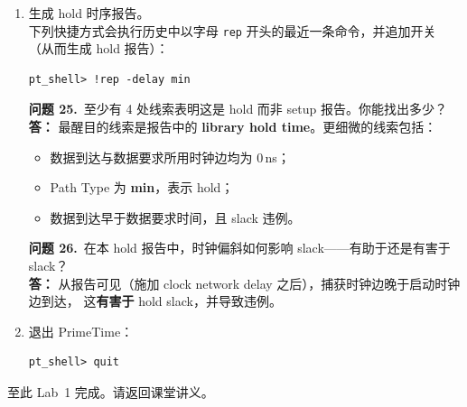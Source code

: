 \begin{enumerate}
\begin{questionBox}
\textbf{问题 21.}\ 写出起点与终点触发器的实例名。\\[0.35em]
\textbf{答：}\\
\begin{lstlisting}
Startpoint: I_ORCA_TOP/I_BLENDER/s3_op2_reg[18]
  (rising edge-triggered flip-flop clocked by SYS_CLK)
Endpoint:   I_ORCA_TOP/I_BLENDER/s4_op2_reg[31]
  (rising edge-triggered flip-flop clocked by SYS_CLK)
Path Group: SYS_CLK
Path Type:  max
\end{lstlisting}

\textbf{问题 22.}\ 该时序路径的时钟偏斜（clock skew）为 0.511\,ns；可用报告中的哪两行计算得到？\\[0.35em]
\textbf{答：} 可用启动端与捕获端的 \texttt{clock network delay (propagated)} 两行：
$3.247 - 2.736 = 0.511$\,ns。
\end{questionBox}

\begin{questionBox}
\textbf{问题 23.}\ 该时钟偏斜如何影响松弛（slack）——有助于还是有害于 slack？\\[0.35em]
\textbf{答：} 在本条 setup 报告中，时钟偏斜\textbf{有害于} slack：
启动端触发器的时钟延迟使数据晚到约 0.511\,ns，从而加大 setup 违例。

\textbf{问题 24.}\ 违例相对于时钟周期有多大？\\[0.35em]
\textbf{答：} 时钟周期为 8\,ns，违例约 0.987\,ns，大约相当于周期的 \textbf{12\%}。
\end{questionBox}

  \item 生成 hold 时序报告。\\
        下列快捷方式会执行历史中以字母 \texttt{rep} 开头的最近一条命令，并追加开关 （从而生成 hold 报告）：
\begin{lstlisting}
pt_shell> !rep -delay min
\end{lstlisting}

\begin{questionBox}
\textbf{问题 25.}\ 至少有 4 处线索表明这是 hold 而非 setup 报告。你能找出多少？\\[0.35em]
\textbf{答：} 最醒目的线索是报告中的 \textbf{library hold time}。更细微的线索包括：
\begin{itemize}
  \item 数据到达与数据要求所用时钟边均为 0\,ns；
  \item Path Type 为 \textbf{min}，表示 hold；
  \item 数据到达早于数据要求时间，且 slack 违例。
\end{itemize}

\textbf{问题 26.}\ 在本 hold 报告中，时钟偏斜如何影响 slack——有助于还是有害于 slack？\\[0.35em]
\textbf{答：} 从报告可见（施加 clock network delay 之后），捕获时钟边晚于启动时钟边到达，
这\textbf{有害于} hold slack，并导致违例。
\end{questionBox}

  \item 退出 PrimeTime：
\begin{lstlisting}
pt_shell> quit
\end{lstlisting}
\end{enumerate}

\noindent 至此 Lab~1 完成。请返回课堂讲义。
